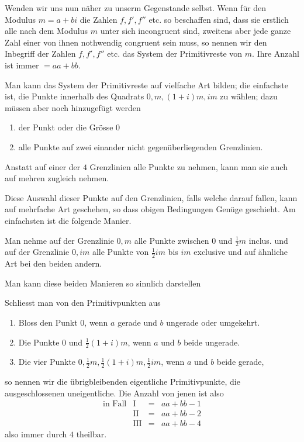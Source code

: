 Wenden wir uns nun näher zu unserm Gegenstande selbst. Wenn für den Modulus $m=a+bi$ die Zahlen $f,f',f''$ etc. so beschaffen sind, dass sie erstlich alle nach dem Modulus $m$ unter sich incongruent sind, zweitens aber jede ganze Zahl einer von ihnen nothwendig congruent sein muss, so nennen wir den
Inbegriff der Zahlen $f,f',f''$ etc. das System der Primitivreste von $m$. Ihre Anzahl ist immer $=aa+bb$.

Man kann das System der Primitivreste auf vielfache Art bilden; die einfachste ist, die Punkte innerhalb des Quadrats $0,m,(1+i)m,im$ zu wählen; dazu müssen aber noch hinzugefügt werden
\begin{enumerate}
\item[I.] der Punkt oder die Grösse $0$
\item[II.] alle Punkte auf zwei einander nicht gegenüberliegenden Grenzlinien.
\end{enumerate}
Anstatt auf einer der $4$ Grenzlinien alle Punkte zu nehmen, kann man sie auch auf mehren zugleich nehmen.

Diese Auswahl dieser Punkte auf den Grenzlinien, falls welche darauf fallen, kann auf mehrfache Art geschehen, so dass obigen Bedingungen Genüge geschieht. Am einfachsten ist die folgende Manier.

Man nehme auf der Grenzlinie $0,m$ alle Punkte zwischen $0$ und $\frac12m$ inclus. und auf der Grenzlinie $0,im$ alle Punkte von $\frac12im$ bis $im$ exclusive und auf ähnliche Art bei den beiden andern.

Man kann diese beiden Manieren so sinnlich darstellen
\begin{center}\resizebox{.85\textwidth}{!}{}\end{center}

Schliesst man von den Primitivpunkten aus
\begin{enumerate}
\item[I.] Bloss den Punkt $0$, wenn $a$ gerade und $b$ ungerade oder umgekehrt.
\item[II.] Die Punkte $0$ und $\frac12(1+i)m$, wenn $a$ und $b$ beide ungerade.
\item[III.] Die vier Punkte $0,\frac12m,\frac12(1+i)m,\frac12im$, wenn $a$ und $b$ beide gerade,
\end{enumerate}
so nennen wir die übrigbleibenden eigentliche Primitivpunkte, die ausgeschlossenen uneigentliche. Die Anzahl von jenen ist also
\[
\begin{array}{rrcl}
\text{in Fall}&\mathrm{I}&=&aa+bb-1\\
&\mathrm{II}&=&aa+bb-2\\
&\mathrm{III}&=&aa+bb-4
\end{array}
\]
also immer durch $4$ theilbar.

